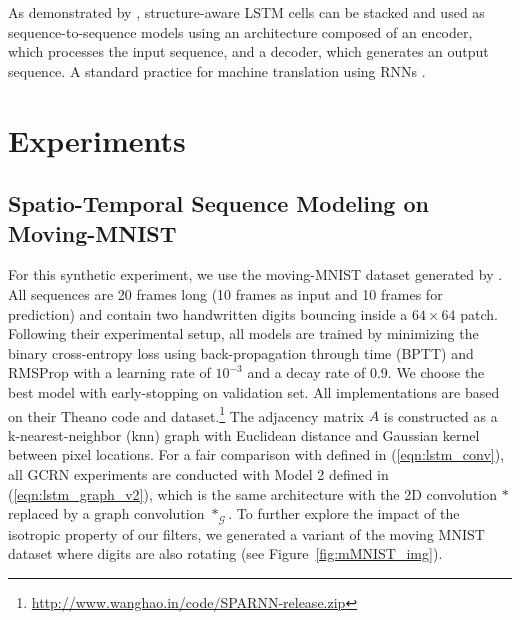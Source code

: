 \documentclass{article} %
\newcommand{\G}{\mathcal{G}}
\newcommand{\figref}[1]{Figure~\ref{fig:#1}}
\newcommand{\eqnref}[1]{(\ref{eqn:#1})}
\begin{document}
As demonstrated by \citet{convlstm}, structure-aware LSTM cells can be stacked
and used as sequence-to-sequence models using an architecture composed of an
encoder, which processes the input sequence, and a decoder, which generates an
output sequence. A standard practice for machine translation using RNNs
\citep{gru, seq2seq}.

\section{Experiments} \label{experiments}

\subsection{Spatio-Temporal Sequence Modeling on Moving-MNIST}

For this synthetic experiment, we use the moving-MNIST dataset generated by
\citet{convlstm}. All sequences are 20 frames long (10 frames as input and 10
frames for prediction) and contain two handwritten digits bouncing inside a $64
\times 64$ patch. Following their experimental setup, all models are trained by
minimizing the binary cross-entropy loss using back-propagation through time
(BPTT) and RMSProp with a learning rate of $10^{-3}$ and a decay rate of 0.9.
We choose the best model with early-stopping on validation set. All
implementations are based on their Theano code and
dataset.\footnote{\url{http://www.wanghao.in/code/SPARNN-release.zip}} The
adjacency matrix $A$ is constructed as a k-nearest-neighbor (knn) graph with
Euclidean distance and Gaussian kernel between pixel locations. For a fair
comparison with \citet{convlstm} defined in \eqnref{lstm_conv}, all GCRN
experiments are conducted with Model 2 defined in \eqnref{lstm_graph_v2}, which
is the same architecture with the 2D convolution $\ast$ replaced by a graph
convolution $\ast_\G$. To further explore the impact of the isotropic property
of our filters, we generated a variant of the moving MNIST dataset where digits
are also rotating (see \figref{mMNIST_img}).
\end{document}
